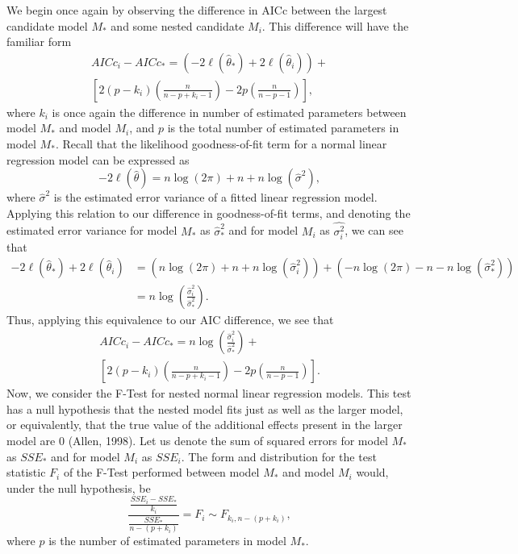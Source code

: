 We begin once again by observing the difference in AICc between the largest candidate model $M_*$ and some nested candidate $M_i$. This difference
will have the familiar form
\begin{equation*}
	\begin{split}
	AICc_i - AICc_* = \left( -2 \ell (\hat{\theta}_*) + 2 \ell (\hat{\theta}_i) \right) + \\
	\left[ 2(p-k_i) \left( \frac{n}{n-p+k_i-1} \right) - 2p \left( \frac{n}{n-p-1} \right) \right] ,
	\end{split}
\end{equation*}
where $k_i$ is once again the difference in number of estimated parameters between model $M_*$ and model $M_i$, and $p$ is the total number of
estimated parameters in model $M_*$. Recall that the likelihood goodness-of-fit term for a normal linear regression model can be expressed as
\begin{equation*}
	-2 \ell (\hat{\theta}) = n \log(2 \pi) + n + n \log(\hat{\sigma} ^2 ) ,
\end{equation*}
where $\hat{\sigma} ^2$ is the estimated error variance of a fitted linear regression model. Applying this relation to our difference in goodness-of-fit
terms, and denoting the estimated error variance for model $M_*$ as $\hat{\sigma}_* ^2$ and for model $M_i$ as $\hat{\sigma^2_i}$, we can see that
\begin{equation*}
	\begin{split}
	-2 \ell (\hat{\theta}_*) + 2 \ell (\hat{\theta}_i) & = (n\log(2\pi) + n + n\log(\hat{\sigma}^2_i)) + (-n\log(2\pi) - n - n\log(\hat{\sigma}^2_*)) \\
	& = n\log \left( \frac{\hat{\sigma}^2_i}{\hat{\sigma}^2_*} \right) .
	\end{split}
\end{equation*}
Thus, applying this equivalence to our AIC difference, we see that
\begin{equation*}
	\begin{split}
	AICc_i - AICc_* = n\log \left( \frac{\hat{\sigma}^2_i}{\hat{\sigma}^2_*} \right) + \\
	\left[ 2(p-k_i) \left( \frac{n}{n-p+k_i-1} \right) - 2p \left( \frac{n}{n-p-1} \right) \right] .
	\end{split}
\end{equation*}
Now, we consider the F-Test for nested normal linear regression models. This test has a null hypothesis that the nested model fits just as well as the
larger model, or equivalently, that the true value of the additional effects present in the larger model are 0 (Allen, 1998). Let us denote the sum
of squared errors for model $M_*$ as $SSE_*$ and for model $M_i$ as $SSE_i$. The form and distribution for the test statistic $F_i$ of the F-Test 
performed between model $M_*$ and model $M_i$ would, under the null hypothesis, be
\begin{equation*}
	\frac{\frac{SSE_i - SSE_*}{k_i}}{\frac{SSE_*}{n-(p+k_i)}} = F_i \sim F_{k_i, n-(p+k_i)} ,
\end{equation*}
where $p$ is the number of estimated parameters in model $M_*$.

